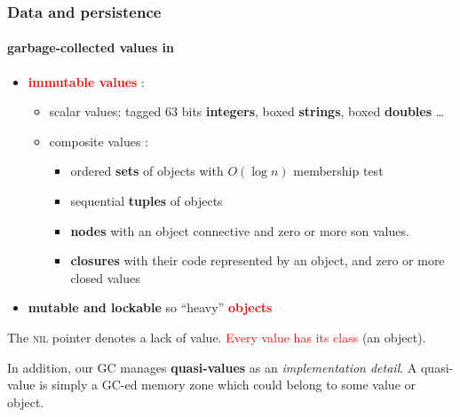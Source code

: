 \documentclass[xcolor=svgnames,final,smaller,a4]{beamer}
\begin{document}
\begin{frame}
    \frametitle{Data and persistence}
    \framesubtitle{garbage-collected values in \Bismon}

    \begin{itemize}
    \item {\textcolor{red}{\textbf{immutable values}}}  {} : \begin{itemize}
    \item scalar values: tagged 63 bits \textbf{integers}, boxed \textbf{strings}, boxed \textbf{doubles} {} \ldots
    \item composite values : \begin{itemize}
    \item ordered \textbf{sets} of objects with $O(\log n)$ membership test
    \item sequential \textbf{tuples} of objects {}
    \item \textbf{nodes} with an object connective and zero or more son values.
      \item \textbf{closures} with their code represented by an object, and zero or more closed values {}
    \end{itemize}
    \end{itemize}
    \item \textbf{mutable and lockable} so ``heavy'' \textbf{\textcolor{red}{objects}} {}
    \end{itemize}

    The \textsc{nil} pointer denotes a lack of value. \textcolor{red}{Every value has its class} (an object).
    
    In addition, our GC manages \textbf{quasi-values} as an
    \textit{implementation detail}. A quasi-value is simply a GC-ed
    memory zone which could belong to some value or object.
\end{frame}
\end{document}
